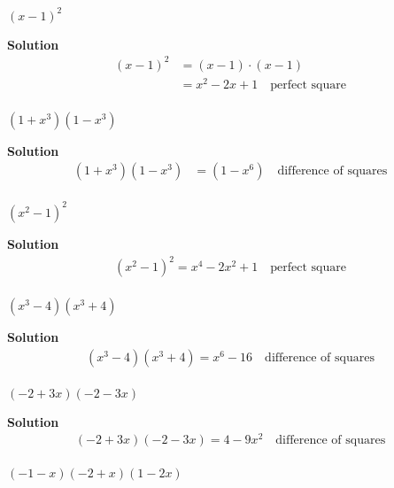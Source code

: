 \begin{tcolorbox}[title=Problem 7, breakable]
${(x - 1)}^2$
\end{tcolorbox}

\textbf{Solution}
\begin{align*}
{(x - 1)}^2 &= (x - 1) \cdot (x - 1) \\
&= x^2 - 2x + 1 \quad \text{perfect square} \\
\end{align*}

\begin{tcolorbox}[title=Problem 11, breakable]
$(1 + x^3)(1 - x^3)$
\end{tcolorbox}

\textbf{Solution}
\begin{align*}
(1 + x^3)(1 - x^3) &= (1 - x^6) \quad \text{difference of squares} \\
\end{align*}

\begin{tcolorbox}[title=Problem 13, breakable]
${(x^2 - 1)}^2$
\end{tcolorbox}

\textbf{Solution}
\begin{align*}
{(x^2 - 1)}^2 = x^4 - 2x^2 + 1 \quad \text{perfect square} \\
\end{align*}

\begin{tcolorbox}[title=Problem 17, breakable]
$(x^3 - 4)(x^3 + 4)$
\end{tcolorbox}

\textbf{Solution}
\begin{align*}
(x^3 - 4)(x^3 + 4) = x^6 - 16 \quad \text{difference of squares} \\
\end{align*}

\begin{tcolorbox}[title=Problem 19, breakable]
$(-2 + 3x)(-2 - 3x)$
\end{tcolorbox}

\textbf{Solution}
\begin{align*}
(-2 + 3x)(-2 - 3x) = 4 - 9x^2 \quad \text{difference of squares} \\
\end{align*}


\begin{tcolorbox}[title=Problem 23, breakable]
$(-1 - x)(-2 + x)(1 - 2x)$
\end{tcolorbox}


